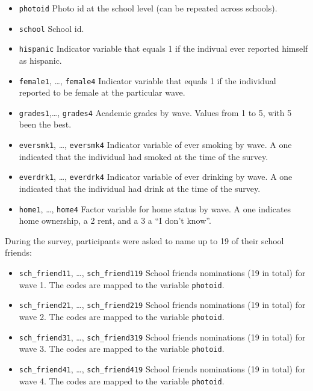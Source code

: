 \documentclass[]{book}
\begin{document}
\begin{itemize}
\item
  \texttt{photoid} Photo id at the school level (can be repeated across schools).
\item
  \texttt{school} School id.
\item
  \texttt{hispanic} Indicator variable that equals 1 if the indivual ever reported
  himself as hispanic.
\item
  \texttt{female1}, \ldots{}, \texttt{female4} Indicator variable that equals 1 if the individual
  reported to be female at the particular wave.
\item
  \texttt{grades1},\ldots{}, \texttt{grades4} Academic grades by wave. Values from 1 to 5, with 5
  been the best.
\item
  \texttt{eversmk1}, \ldots{}, \texttt{eversmk4} Indicator variable of ever smoking by wave. A one
  indicated that the individual had smoked at the time of the survey.
\item
  \texttt{everdrk1}, \ldots{}, \texttt{everdrk4} Indicator variable of ever drinking by wave.
  A one indicated that the individual had drink at the time of the survey.
\item
  \texttt{home1}, \ldots{}, \texttt{home4} Factor variable for home status by wave. A one
  indicates home ownership, a 2 rent, and a 3 a ``I don't know''.
\end{itemize}

During the survey, participants were asked to name up to 19 of their school
friends:

\begin{itemize}
\item
  \texttt{sch\_friend11}, \ldots{}, \texttt{sch\_friend119} School friends nominations (19 in total)
  for wave 1. The codes are mapped to the variable \texttt{photoid}.
\item
  \texttt{sch\_friend21}, \ldots{}, \texttt{sch\_friend219} School friends nominations (19 in total)
  for wave 2. The codes are mapped to the variable \texttt{photoid}.
\item
  \texttt{sch\_friend31}, \ldots{}, \texttt{sch\_friend319} School friends nominations (19 in total)
  for wave 3. The codes are mapped to the variable \texttt{photoid}.
\item
  \texttt{sch\_friend41}, \ldots{}, \texttt{sch\_friend419} School friends nominations (19 in total)
  for wave 4. The codes are mapped to the variable \texttt{photoid}.
\end{itemize}
\end{document}
